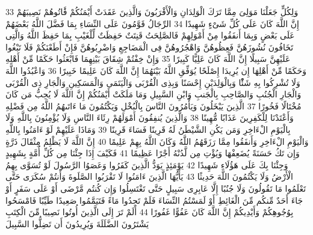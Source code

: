 {\tiny\colorbox{cl_aya}{33}} وَلِكُلٍّ جَعَلْنَا مَوَلِىَ مِمَّا تَرَكَ الْوَلِدَانِ وَالْأَقْرَبُونَ وَالَّذِينَ عَقَدَتْ أَيْمَنُكُمْ فََٔاتُوهُمْ نَصِيبَهُمْ إِنَّ اللَّهَ كَانَ عَلَى كُلِّ شَىْءٍ شَهِيدًا
{\tiny\colorbox{cl_aya}{34}} الرِّجَالُ قَوَّمُونَ عَلَى النِّسَاءِ بِمَا فَضَّلَ اللَّهُ بَعْضَهُمْ عَلَى بَعْضٍ وَبِمَا أَنفَقُوا مِنْ أَمْوَلِهِمْ فَالصَّلِحَتُ قَنِتَتٌ حَفِظَتٌ لِّلْغَيْبِ بِمَا حَفِظَ اللَّهُ وَالَّتِى تَخَافُونَ نُشُوزَهُنَّ فَعِظُوهُنَّ وَاهْجُرُوهُنَّ فِى الْمَضَاجِعِ وَاضْرِبُوهُنَّ فَإِنْ أَطَعْنَكُمْ فَلَا تَبْغُوا عَلَيْهِنَّ سَبِيلًا إِنَّ اللَّهَ كَانَ عَلِيًّا كَبِيرًا
{\tiny\colorbox{cl_aya}{35}} وَإِنْ خِفْتُمْ شِقَاقَ بَيْنِهِمَا فَابْعَثُوا حَكَمًا مِّنْ أَهْلِهِ وَحَكَمًا مِّنْ أَهْلِهَا إِن يُرِيدَا إِصْلَحًا يُوَفِّقِ اللَّهُ بَيْنَهُمَا إِنَّ اللَّهَ كَانَ عَلِيمًا خَبِيرًا
{\tiny\colorbox{cl_aya}{36}} وَاعْبُدُوا اللَّهَ وَلَا تُشْرِكُوا بِهِ شَئًْا وَبِالْوَلِدَيْنِ إِحْسَنًا وَبِذِى الْقُرْبَى وَالْيَتَمَى وَالْمَسَكِينِ وَالْجَارِ ذِى الْقُرْبَى وَالْجَارِ الْجُنُبِ وَالصَّاحِبِ بِالْجَنبِ وَابْنِ السَّبِيلِ وَمَا مَلَكَتْ أَيْمَنُكُمْ إِنَّ اللَّهَ لَا يُحِبُّ مَن كَانَ مُخْتَالًا فَخُورًا
{\tiny\colorbox{cl_aya}{37}} الَّذِينَ يَبْخَلُونَ وَيَأْمُرُونَ النَّاسَ بِالْبُخْلِ وَيَكْتُمُونَ مَا ءَاتَىهُمُ اللَّهُ مِن فَضْلِهِ وَأَعْتَدْنَا لِلْكَفِرِينَ عَذَابًا مُّهِينًا
{\tiny\colorbox{cl_aya}{38}} وَالَّذِينَ يُنفِقُونَ أَمْوَلَهُمْ رِئَاءَ النَّاسِ وَلَا يُؤْمِنُونَ بِاللَّهِ وَلَا بِالْيَوْمِ الْءَاخِرِ وَمَن يَكُنِ الشَّيْطَنُ لَهُ قَرِينًا فَسَاءَ قَرِينًا
{\tiny\colorbox{cl_aya}{39}} وَمَاذَا عَلَيْهِمْ لَوْ ءَامَنُوا بِاللَّهِ وَالْيَوْمِ الْءَاخِرِ وَأَنفَقُوا مِمَّا رَزَقَهُمُ اللَّهُ وَكَانَ اللَّهُ بِهِمْ عَلِيمًا
{\tiny\colorbox{cl_aya}{40}} إِنَّ اللَّهَ لَا يَظْلِمُ مِثْقَالَ ذَرَّةٍ وَإِن تَكُ حَسَنَةً يُضَعِفْهَا وَيُؤْتِ مِن لَّدُنْهُ أَجْرًا عَظِيمًا
{\tiny\colorbox{cl_aya}{41}} فَكَيْفَ إِذَا جِئْنَا مِن كُلِّ أُمَّةٍ بِشَهِيدٍ وَجِئْنَا بِكَ عَلَى هَؤُلَاءِ شَهِيدًا
{\tiny\colorbox{cl_aya}{42}} يَوْمَئِذٍ يَوَدُّ الَّذِينَ كَفَرُوا وَعَصَوُا الرَّسُولَ لَوْ تُسَوَّى بِهِمُ الْأَرْضُ وَلَا يَكْتُمُونَ اللَّهَ حَدِيثًا
{\tiny\colorbox{cl_aya}{43}} يَأَيُّهَا الَّذِينَ ءَامَنُوا لَا تَقْرَبُوا الصَّلَوةَ وَأَنتُمْ سُكَرَى حَتَّى تَعْلَمُوا مَا تَقُولُونَ وَلَا جُنُبًا إِلَّا عَابِرِى سَبِيلٍ حَتَّى تَغْتَسِلُوا وَإِن كُنتُم مَّرْضَى أَوْ عَلَى سَفَرٍ أَوْ جَاءَ أَحَدٌ مِّنكُم مِّنَ الْغَائِطِ أَوْ لَمَسْتُمُ النِّسَاءَ فَلَمْ تَجِدُوا مَاءً فَتَيَمَّمُوا صَعِيدًا طَيِّبًا فَامْسَحُوا بِوُجُوهِكُمْ وَأَيْدِيكُمْ إِنَّ اللَّهَ كَانَ عَفُوًّا غَفُورًا
{\tiny\colorbox{cl_aya}{44}} أَلَمْ تَرَ إِلَى الَّذِينَ أُوتُوا نَصِيبًا مِّنَ الْكِتَبِ يَشْتَرُونَ الضَّلَلَةَ وَيُرِيدُونَ أَن تَضِلُّوا السَّبِيلَ
